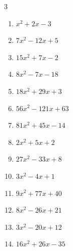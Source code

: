 \begin{multicols}{3}
\begin{enumerate}
        \phantom{$=(x+2)(2x-3)$}

  \item $x^{2}+2x-3$

        \phantom{$=(x+3)(x-1)$}

\columnbreak %

\resetques

  \item $7x^{2}-12x+5$

        \phantom{$=(7x-5)(x-1)$}

  \item $15x^{2}+7x-2$

        \phantom{$=(5x-1)(3x+2)$}

  \item $8x^{2}-7x-18$

        \phantom{$=(x-2)(8x+9)$}

  \item $18x^{2}+29x+3$

        \phantom{$=(2x+3)(9x+1)$}

  \item $56x^{2}-121x+63$

        \phantom{$=(7x-9)(8x-7)$}

  \item $81x^{2}+45x-14$

        \phantom{$=(9x-2)(9x+7)$}

  \item $2x^{2}+5x+2$

        \phantom{$=(2x+1)(x+2)$}

  \item $27x^{2}-33x+8$

        \phantom{$=(3x-1)(9x-8)$}

  \item $3x^{2}-4x+1$

        \phantom{$=(3x-1)(x-1)$}

  \item $9x^{2}+77x+40$

        \phantom{$=(x+8)(9x+5)$}

\columnbreak %

  \item $8x^{2}-26x+21$

        \phantom{$=(4x-7)(2x-3)$}

  \item $3x^{2}-20x+12$

        \phantom{$=(3x-2)(x-6)$}

  \item $16x^{2}+26x-35$


\end{enumerate}
\end{multicols}
